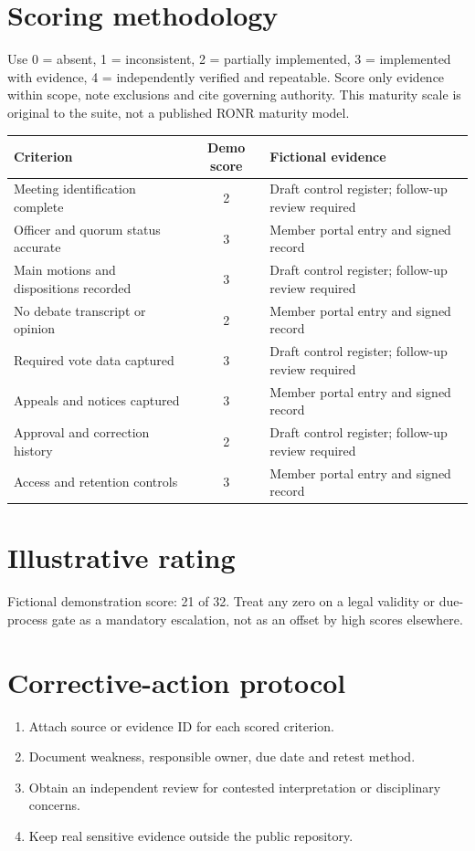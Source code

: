 \documentclass[11pt]{article}
\begin{document}
\SuiteOpen
\section{Scoring methodology}
Use 0 = absent, 1 = inconsistent, 2 = partially implemented, 3 = implemented with evidence, 4 = independently verified and repeatable. Score only evidence within scope, note exclusions and cite governing authority. This maturity scale is original to the suite, not a published RONR maturity model.

\small\begin{longtable}{@{}p{.44\linewidth}cp{.39\linewidth}@{}}\toprule Criterion & Demo score & Fictional evidence\\\midrule\endhead

Meeting identification complete & 2 & Draft control register; follow-up review required\\
Officer and quorum status accurate & 3 & Member portal entry and signed record\\
Main motions and dispositions recorded & 3 & Draft control register; follow-up review required\\
No debate transcript or opinion & 2 & Member portal entry and signed record\\
Required vote data captured & 3 & Draft control register; follow-up review required\\
Appeals and notices captured & 3 & Member portal entry and signed record\\
Approval and correction history & 2 & Draft control register; follow-up review required\\
Access and retention controls & 3 & Member portal entry and signed record\\
\bottomrule\end{longtable}\normalsize
\section{Illustrative rating}
Fictional demonstration score: 21 of 32. Treat any zero on a legal validity or due-process gate as a mandatory escalation, not as an offset by high scores elsewhere.

\section{Corrective-action protocol}
\begin{enumerate}[leftmargin=*,itemsep=4pt]
\item Attach source or evidence ID for each scored criterion.
\item Document weakness, responsible owner, due date and retest method.
\item Obtain an independent review for contested interpretation or disciplinary concerns.
\item Keep real sensitive evidence outside the public repository.
\end{enumerate}
\end{document}
